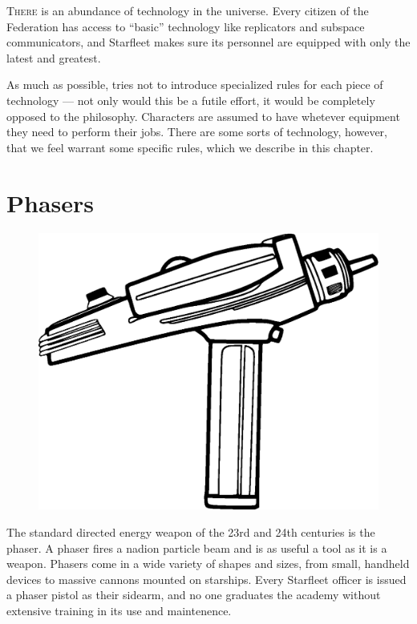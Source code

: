 \documentclass[12pt,titlepage,openany]{book}
\begin{document}
\lettrine[lines=1]{T}{here} is an abundance of technology in the \StarTrek{}
universe. Every citizen of the Federation has access to ``basic'' technology
like replicators and subspace communicators, and Starfleet makes sure its
personnel are equipped with only the latest and greatest.

As much as possible, \StarTrekFate{} tries not to introduce specialized rules
for each piece of technology --- not only would this be a futile effort, it
would be completely opposed to the \Fate{} philosophy. Characters are assumed
to have whetever equipment they need to perform their jobs. There are some
sorts of technology, however, that we feel warrant some specific rules, which
we describe in this chapter.

\section{Phasers}\label{sec:phasers}

\begin{figure}
    \vspace{-3em}
    \centering
    \includegraphics[width=0.8\linewidth]{img/Phaser.eps}\\
\end{figure}

The standard directed energy weapon of the 23rd and 24th centuries is the
phaser. A phaser fires a nadion particle beam and is as useful a tool as it is
a weapon. Phasers come in a wide variety of shapes and sizes, from small,
handheld devices to massive cannons mounted on starships. Every Starfleet
officer is issued a phaser pistol as their sidearm, and no one graduates the
academy without extensive training in its use and maintenence.
\end{document}
